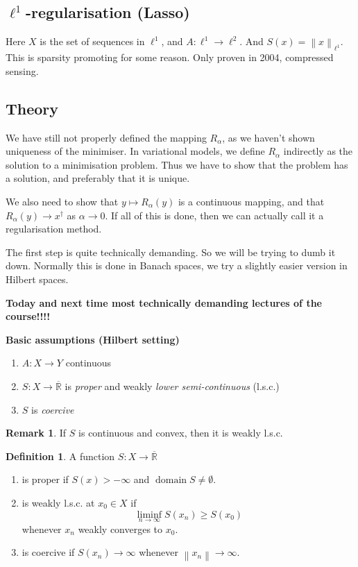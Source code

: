 \documentclass[12pt]{article}
\theoremstyle{definition}
\newtheorem{definition}{Definition}[section]
\newtheorem*{remark}{Remark}
\newcommand{\real}{\mathbb{R}}   %
\DeclareMathOperator{\domain}{domain}
\newcommand\norm[1]{\left\lVert#1\right\rVert}
\begin{document}
\subsection*{$\ell^1$-regularisation (Lasso)}
Here $X$ is the set of sequences in $\ell^1$, and $A:\ell^1\to\ell^2$. And $S(x) = \norm{x}_{\ell^1}$. This is sparsity promoting for some reason. Only proven in 2004, compressed sensing. 

\subsection{Theory}
We have still not properly defined the mapping $R_\alpha$, as we haven't shown uniqueness of the minimiser. In variational models, we define $R_\alpha$ indirectly as the solution to a minimisation problem. Thus we have to show that the problem has a solution, and preferably that it is unique. 

We also need to show that $y\mapsto R_\alpha(y)$ is a continuous mapping, and that $R_\alpha(y) \to x^\dagger $ as $\alpha\to 0$. If all of this is done, then we can actually call it a regularisation method.

The first step is quite technically demanding. So we will be trying to dumb it down. Normally this is done in Banach spaces, we try a slightly easier version in Hilbert spaces.

\textbf{Today and next time most technically demanding lectures of the course!!!!}

\textbf{Basic assumptions (Hilbert setting)}
\begin{enumerate}[label=(\alph*)]
    \item $A:X\to Y$ continuous
    \item $S:X\to\overline{\real}$ is \textit{proper} and weakly \textit{lower semi-continuous} (l.s.c.)
    \item $S$ is \textit{coercive}
\end{enumerate}
\begin{remark}
    If $S$ is continuous and convex, then it is weakly l.s.c.
\end{remark}

\begin{definition}
    A function $S:X\to\overline{\real}$ 
    \begin{enumerate}[label={(\alph*)}]
        \item is proper if $S(x)>-\infty$ and $\domain S\neq \emptyset$.
        \item is weakly l.s.c. at $x_0\in X$ if
        \begin{equation*}
            \liminf_{n\to\infty} S(x_n) \geq S(x_0)
        \end{equation*}
        whenever $x_n$ weakly converges to $x_0$.
        \item is coercive if $S(x_n)\to\infty$ whenever $\norm{x_n}\to\infty$.
    \end{enumerate}
\end{definition}
\end{document}
